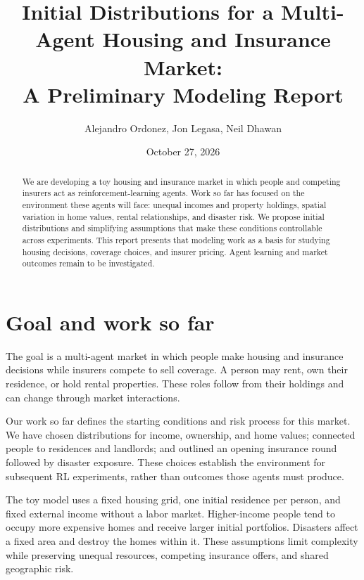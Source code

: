 \documentclass[11pt]{article}
\title{Initial Distributions for a Multi-Agent Housing and Insurance Market:\\A Preliminary Modeling Report}
\author{Alejandro Ordonez, Jon Legasa, Neil Dhawan}
\date{October 27, 2026}
\begin{document}
\maketitle

\begin{abstract}
We are developing a toy housing and insurance market in which people and competing insurers act as reinforcement-learning agents. Work so far has focused on the environment these agents will face: unequal incomes and property holdings, spatial variation in home values, rental relationships, and disaster risk. We propose initial distributions and simplifying assumptions that make these conditions controllable across experiments. This report presents that modeling work as a basis for studying housing decisions, coverage choices, and insurer pricing. Agent learning and market outcomes remain to be investigated.
\end{abstract}

\section{Goal and work so far}
The goal is a multi-agent market in which people make housing and insurance decisions while insurers compete to sell coverage. A person may rent, own their residence, or hold rental properties. These roles follow from their holdings and can change through market interactions.

Our work so far defines the starting conditions and risk process for this market. We have chosen distributions for income, ownership, and home values; connected people to residences and landlords; and outlined an opening insurance round followed by disaster exposure. These choices establish the environment for subsequent RL experiments, rather than outcomes those agents must produce.

The toy model uses a fixed housing grid, one initial residence per person, and fixed external income without a labor market. Higher-income people tend to occupy more expensive homes and receive larger initial portfolios. Disasters affect a fixed area and destroy the homes within it. These assumptions limit complexity while preserving unequal resources, competing insurance offers, and shared geographic risk.
\end{document}
